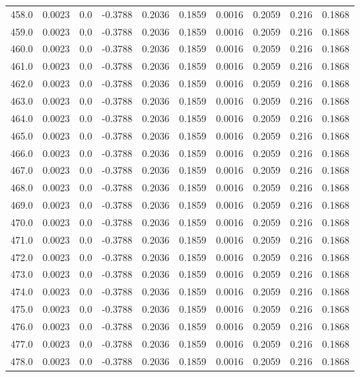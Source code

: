\begin{longtable}{lrrrrrrrrr}
458.0 & 0.0023 & 0.0 & -0.3788 & 0.2036 & 0.1859 & 0.0016 & 0.2059 & 0.216 & 0.1868 \\
459.0 & 0.0023 & 0.0 & -0.3788 & 0.2036 & 0.1859 & 0.0016 & 0.2059 & 0.216 & 0.1868 \\
460.0 & 0.0023 & 0.0 & -0.3788 & 0.2036 & 0.1859 & 0.0016 & 0.2059 & 0.216 & 0.1868 \\
461.0 & 0.0023 & 0.0 & -0.3788 & 0.2036 & 0.1859 & 0.0016 & 0.2059 & 0.216 & 0.1868 \\
462.0 & 0.0023 & 0.0 & -0.3788 & 0.2036 & 0.1859 & 0.0016 & 0.2059 & 0.216 & 0.1868 \\
463.0 & 0.0023 & 0.0 & -0.3788 & 0.2036 & 0.1859 & 0.0016 & 0.2059 & 0.216 & 0.1868 \\
464.0 & 0.0023 & 0.0 & -0.3788 & 0.2036 & 0.1859 & 0.0016 & 0.2059 & 0.216 & 0.1868 \\
465.0 & 0.0023 & 0.0 & -0.3788 & 0.2036 & 0.1859 & 0.0016 & 0.2059 & 0.216 & 0.1868 \\
466.0 & 0.0023 & 0.0 & -0.3788 & 0.2036 & 0.1859 & 0.0016 & 0.2059 & 0.216 & 0.1868 \\
467.0 & 0.0023 & 0.0 & -0.3788 & 0.2036 & 0.1859 & 0.0016 & 0.2059 & 0.216 & 0.1868 \\
468.0 & 0.0023 & 0.0 & -0.3788 & 0.2036 & 0.1859 & 0.0016 & 0.2059 & 0.216 & 0.1868 \\
469.0 & 0.0023 & 0.0 & -0.3788 & 0.2036 & 0.1859 & 0.0016 & 0.2059 & 0.216 & 0.1868 \\
470.0 & 0.0023 & 0.0 & -0.3788 & 0.2036 & 0.1859 & 0.0016 & 0.2059 & 0.216 & 0.1868 \\
471.0 & 0.0023 & 0.0 & -0.3788 & 0.2036 & 0.1859 & 0.0016 & 0.2059 & 0.216 & 0.1868 \\
472.0 & 0.0023 & 0.0 & -0.3788 & 0.2036 & 0.1859 & 0.0016 & 0.2059 & 0.216 & 0.1868 \\
473.0 & 0.0023 & 0.0 & -0.3788 & 0.2036 & 0.1859 & 0.0016 & 0.2059 & 0.216 & 0.1868 \\
474.0 & 0.0023 & 0.0 & -0.3788 & 0.2036 & 0.1859 & 0.0016 & 0.2059 & 0.216 & 0.1868 \\
475.0 & 0.0023 & 0.0 & -0.3788 & 0.2036 & 0.1859 & 0.0016 & 0.2059 & 0.216 & 0.1868 \\
476.0 & 0.0023 & 0.0 & -0.3788 & 0.2036 & 0.1859 & 0.0016 & 0.2059 & 0.216 & 0.1868 \\
477.0 & 0.0023 & 0.0 & -0.3788 & 0.2036 & 0.1859 & 0.0016 & 0.2059 & 0.216 & 0.1868 \\
478.0 & 0.0023 & 0.0 & -0.3788 & 0.2036 & 0.1859 & 0.0016 & 0.2059 & 0.216 & 0.1868 \\

\end{longtable}
